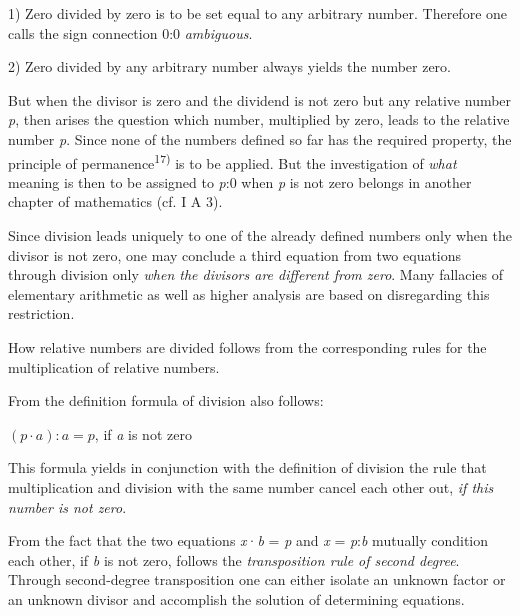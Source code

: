 \thispagestyle{fancy}

\vspace{0.5cm}

1) Zero divided by zero is to be set equal to any arbitrary number. Therefore one calls the sign connection 0:0 \textit{ambiguous}.

2) Zero divided by any arbitrary number always yields the number zero.

But when the divisor is zero and the dividend is not zero but any relative number \textit{p}, then arises the question which number, multiplied by zero, leads to the relative number \textit{p}. Since none of the numbers defined so far has the required property, the principle of permanence\textsuperscript{17)} is to be applied. But the investigation of \textit{what} meaning is then to be assigned to \textit{p}:0 when \textit{p} is not zero belongs in another chapter of mathematics (cf. I A 3).

Since division leads uniquely to one of the already defined numbers only when the divisor is not zero, one may conclude a third equation from two equations through division only \textit{when the divisors are different from zero}. Many fallacies of elementary arithmetic as well as higher analysis are based on disregarding this restriction.

How relative numbers are divided follows from the corresponding rules for the multiplication of relative numbers.

From the definition formula of division also follows:

\vspace{-0.2cm}
\begin{center}
$(p \cdot a): a = p $, if \textit{a} is not zero
\end{center}
\vspace{-0.2cm}

This formula yields in conjunction with the definition of division the rule that multiplication and division with the same number cancel each other out, \textit{if this number is not zero}.

From the fact that the two equations \textit{x}·\textit{b} = \textit{p} and \textit{x} = \textit{p}:\textit{b} mutually condition each other, if \textit{b} is not zero, follows the \textit{transposition rule of second degree}. Through second-degree transposition one can either isolate an unknown factor or an unknown divisor and accomplish the solution of determining equations.

